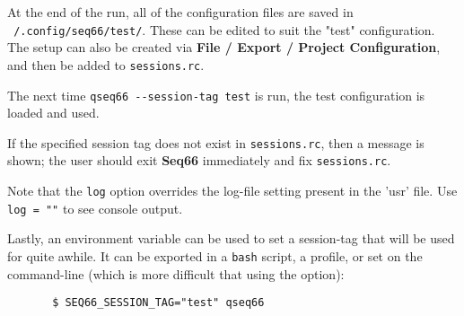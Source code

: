    At the end of the run, all of the configuration files are
   saved in 
   \texttt{~/.config/seq66/test/}.
   These can be edited to suit the "test" configuration.
   The setup can also be created via
   \textbf{File / Export / Project Configuration},
   and then be added to \texttt{sessions.rc}.

   The next time 
   \texttt{qseq66 -{}-session-tag test}
   is run, the test configuration is loaded and used.

   If the specified session tag does not exist in \texttt{sessions.rc},
   then a message is shown; the user should exit \textbf{Seq66} immediately
   and fix \texttt{sessions.rc}.

   Note that the \texttt{log} option overrides the log-file setting
   present in the 'usr' file. Use \texttt{log = ""} to see console output.

   Lastly, an environment variable can be used to set a session-tag that
   will be used for quite awhile.
   It can be exported in a \texttt{bash} script, a profile,
   or set on the command-line (which is more difficult that using the
   option):

   \begin{verbatim}
       $ SEQ66_SESSION_TAG="test" qseq66
   \end{verbatim}


